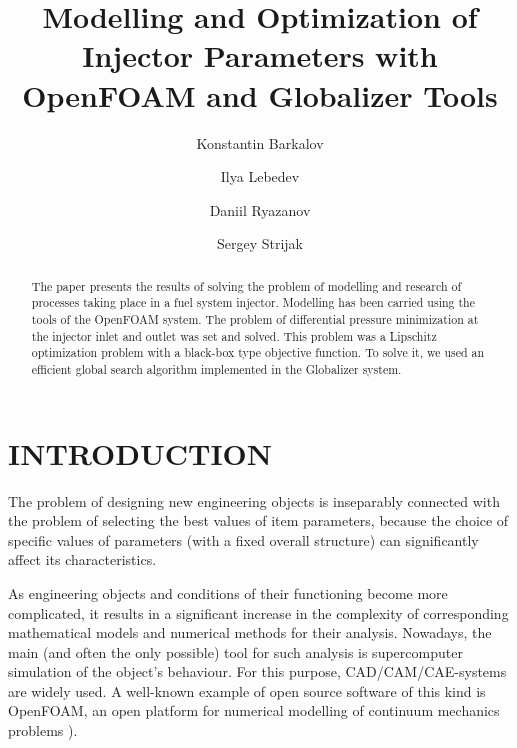 \documentclass{aip-cp}
\begin{document}
\title{Modelling and Optimization of Injector Parameters with OpenFOAM and Globalizer Tools}

\author[aff1]{Konstantin Barkalov}
\author[aff1]{Ilya Lebedev}
\author[aff2]{Daniil Ryazanov}
\author[aff2]{Sergey Strijak}


\maketitle

\begin{abstract}
The paper presents the results of solving the problem of modelling and research of processes taking place in a fuel system injector. Modelling has been carried using the tools of the OpenFOAM system. The problem of differential pressure minimization at the injector inlet and outlet was set and solved. This problem was a Lipschitz optimization problem with a black-box type objective function. To solve it, we used an efficient global search algorithm implemented in the Globalizer system.
\end{abstract}

\section{INTRODUCTION}

The problem of designing new engineering objects is inseparably connected with the problem of selecting the best values of item parameters, because the choice of specific values of parameters (with a fixed overall structure) can significantly affect its characteristics.

As engineering objects  and conditions of their functioning become more complicated, it results in a significant increase in the complexity of corresponding mathematical models and numerical methods for their analysis. Nowadays, the main (and often the only possible) tool for such analysis is supercomputer simulation of the object's behaviour. For this purpose, CAD/CAM/CAE-systems are widely used. A well-known example of open source software of this kind is OpenFOAM, an open platform for numerical modelling of continuum mechanics problems \cite{OpenFOAM}).
\end{document}
